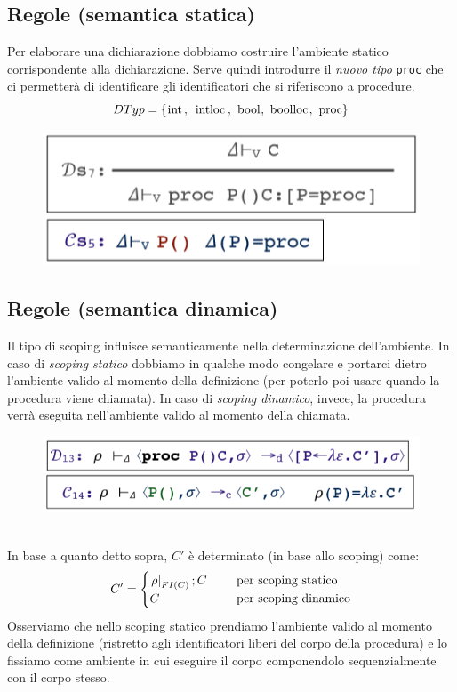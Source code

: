 \documentclass[a4paper,oneside,titlepage]{book}
\begin{document}
\subsection{Regole (semantica statica)}
Per elaborare una dichiarazione dobbiamo costruire l'ambiente statico corrispondente alla dichiarazione. Serve quindi introdurre il \textit{nuovo tipo} \lstinline|proc| che ci permetterà di identificare gli identificatori che si riferiscono a procedure.
\[ DTyp = \{\text{\lstinline|int, intloc, bool, boolloc, proc|}\} \]
\begin{figure}[htp]
	\centering
	\includegraphics[width=\textwidth, height=\textheight, keepaspectratio]{procRegole1.png}
\end{figure}

\subsection{Regole (semantica dinamica)}
Il tipo di scoping influisce semanticamente nella determinazione dell'ambiente. In caso di \textit{scoping statico} dobbiamo in qualche modo congelare e portarci dietro l'ambiente valido al momento della definizione (per poterlo poi usare quando la procedura viene chiamata). In caso di \textit{scoping dinamico}, invece, la procedura verrà eseguita nell'ambiente valido al momento della chiamata.
\begin{figure}[htp]
	\centering
	\includegraphics[width=\textwidth, height=\textheight, keepaspectratio]{procRegole2.png}
\end{figure}
\\
In base a quanto detto sopra, $C'$ è determinato (in base allo scoping) come:
\[
C' =
	\begin{cases}
	\left. \rho \right|_{FI(C)};C & \hspace{0.5cm} \text{per scoping statico} \\
	C& \hspace{0.5cm} \text{per scoping dinamico}
	\end{cases}
\]
Osserviamo che nello scoping statico prendiamo l'ambiente valido al momento della definizione (ristretto agli identificatori liberi del corpo della procedura) e lo fissiamo come ambiente in cui eseguire il corpo componendolo sequenzialmente con il corpo stesso.
\end{document}
